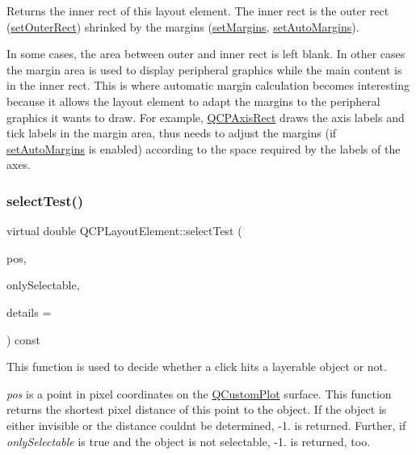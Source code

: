 Returns the inner rect of this layout element. The inner rect is the outer rect (\hyperlink{class_q_c_p_layout_element_a38975ea13e36de8e53391ce41d94bc0f}{set\+Outer\+Rect}) shrinked by the margins (\hyperlink{class_q_c_p_layout_element_a8f450b1f3f992ad576fce2c63d8b79cf}{set\+Margins}, \hyperlink{class_q_c_p_layout_element_accfda49994e3e6d51ed14504abf9d27d}{set\+Auto\+Margins}).

In some cases, the area between outer and inner rect is left blank. In other cases the margin area is used to display peripheral graphics while the main content is in the inner rect. This is where automatic margin calculation becomes interesting because it allows the layout element to adapt the margins to the peripheral graphics it wants to draw. For example, \hyperlink{class_q_c_p_axis_rect}{Q\+C\+P\+Axis\+Rect} draws the axis labels and tick labels in the margin area, thus needs to adjust the margins (if \hyperlink{class_q_c_p_layout_element_accfda49994e3e6d51ed14504abf9d27d}{set\+Auto\+Margins} is enabled) according to the space required by the labels of the axes. \mbox{\label{class_q_c_p_layout_element_a9e264e2033d3c136707792cd77932783}} 
\subsubsection{\texorpdfstring{select\+Test()}{selectTest()}\hspace{0.1cm}{\footnotesize\ttfamily [1/2]}}
{\footnotesize\ttfamily virtual double Q\+C\+P\+Layout\+Element\+::select\+Test (\begin{DoxyParamCaption}\item[{const Q\+PointF \&}]{pos,  }\item[{bool}]{only\+Selectable,  }\item[{Q\+Variant $\ast$}]{details = {} }\end{DoxyParamCaption}) const\hspace{0.3cm}{\ttfamily [virtual]}}

This function is used to decide whether a click hits a layerable object or not.

{\itshape pos} is a point in pixel coordinates on the \hyperlink{class_q_custom_plot}{Q\+Custom\+Plot} surface. This function returns the shortest pixel distance of this point to the object. If the object is either invisible or the distance couldn\textquotesingle{}t be determined, -\/1. is returned. Further, if {\itshape only\+Selectable} is true and the object is not selectable, -\/1. is returned, too.

